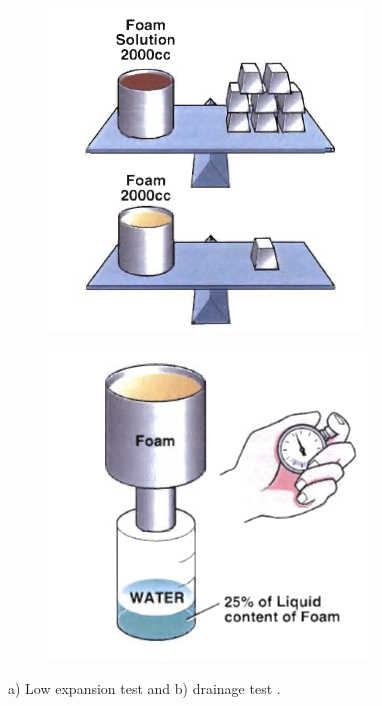 \documentclass[12pt]{report}
\begin{document}
\begin{figure}[H]

\centering
\begin{subfigure}{.45\textwidth}
    \centering
    \includegraphics[width=\textwidth]{low_expansion_test.png}
    \caption{}
\end{subfigure}
\begin{subfigure}{.45\textwidth}
    \centering
    \includegraphics[width=\textwidth]{drainage_test.png}
    \caption{}
\end{subfigure}

\caption{a) Low expansion test and b) drainage test \cite{aamodt2020review}.}
\label{ch2:figure:tests}
\end{figure}
\end{document}
